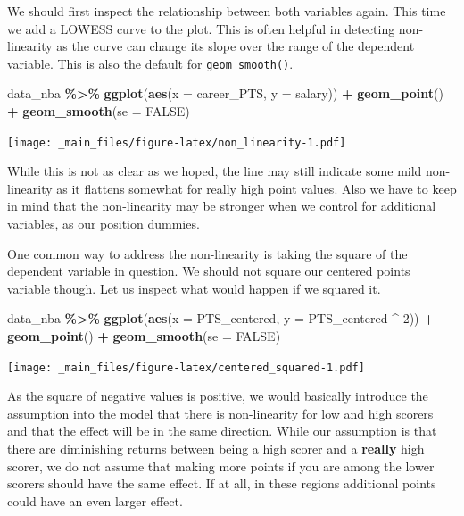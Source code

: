 \documentclass[
]{book}
\newenvironment{Shaded}{\begin{snugshade}}{\end{snugshade}}
\newcommand{\AttributeTok}[1]{\textcolor[rgb]{0.13,0.29,0.53}{#1}}
\newcommand{\ConstantTok}[1]{\textcolor[rgb]{0.56,0.35,0.01}{#1}}
\newcommand{\DecValTok}[1]{\textcolor[rgb]{0.00,0.00,0.81}{#1}}
\newcommand{\FunctionTok}[1]{\textcolor[rgb]{0.13,0.29,0.53}{\textbf{#1}}}
\newcommand{\NormalTok}[1]{#1}
\newcommand{\SpecialCharTok}[1]{\textcolor[rgb]{0.81,0.36,0.00}{\textbf{#1}}}
\begin{document}
We should first inspect the relationship between both variables again. This time
we add a LOWESS curve to the plot. This is often helpful in detecting
non-linearity as the curve can change its slope over the range of the dependent
variable. This is also the default for \texttt{geom\_smooth()}.

\begin{Shaded}
\begin{Highlighting}[]
\NormalTok{data\_nba }\SpecialCharTok{\%\textgreater{}\%} 
  \FunctionTok{ggplot}\NormalTok{(}\FunctionTok{aes}\NormalTok{(}\AttributeTok{x =}\NormalTok{ career\_PTS, }\AttributeTok{y =}\NormalTok{ salary)) }\SpecialCharTok{+}
  \FunctionTok{geom\_point}\NormalTok{() }\SpecialCharTok{+}
  \FunctionTok{geom\_smooth}\NormalTok{(}\AttributeTok{se =} \ConstantTok{FALSE}\NormalTok{)}
\end{Highlighting}
\end{Shaded}

\texttt{[image: \_main\_files/figure-latex/non\_linearity-1.pdf]}

While this is not as clear as we hoped, the line may still indicate some mild
non-linearity as it flattens somewhat for really high point values. Also we have
to keep in mind that the non-linearity may be stronger when we control for
additional variables, as our position dummies.

One common way to address the non-linearity is taking the square of the
dependent variable in question. We should not square our centered points
variable though. Let us inspect what would happen if we squared it.

\begin{Shaded}
\begin{Highlighting}[]
\NormalTok{data\_nba }\SpecialCharTok{\%\textgreater{}\%} 
  \FunctionTok{ggplot}\NormalTok{(}\FunctionTok{aes}\NormalTok{(}\AttributeTok{x =}\NormalTok{ PTS\_centered, }\AttributeTok{y =}\NormalTok{ PTS\_centered }\SpecialCharTok{\^{}} \DecValTok{2}\NormalTok{)) }\SpecialCharTok{+}
  \FunctionTok{geom\_point}\NormalTok{() }\SpecialCharTok{+}
  \FunctionTok{geom\_smooth}\NormalTok{(}\AttributeTok{se =} \ConstantTok{FALSE}\NormalTok{)}
\end{Highlighting}
\end{Shaded}

\texttt{[image: \_main\_files/figure-latex/centered\_squared-1.pdf]}

As the square of negative values is positive, we would basically introduce the
assumption into the model that there is non-linearity for low and high scorers
and that the effect will be in the same direction. While our assumption is that
there are diminishing returns between being a high scorer and a \textbf{really} high
scorer, we do not assume that making more points if you are among the lower
scorers should have the same effect. If at all, in these regions additional
points could have an even larger effect.
\end{document}
